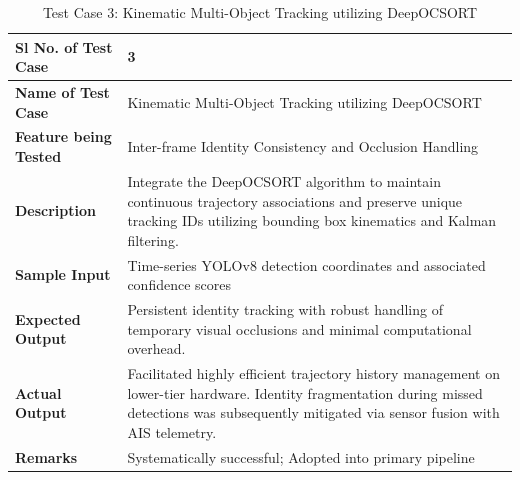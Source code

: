 \begin{table}[H]
\centering
\caption{Test Case 3: Kinematic Multi-Object Tracking utilizing DeepOCSORT}
\label{tab:testcase3}
\begin{tabular}{|p{}|p{}|}
\hline
\textbf{Sl No. of Test Case} & 3 \\
\hline
\textbf{Name of Test Case} & Kinematic Multi-Object Tracking utilizing DeepOCSORT \\
\hline
\textbf{Feature being Tested} & Inter-frame Identity Consistency and Occlusion Handling \\
\hline
\textbf{Description} & Integrate the DeepOCSORT algorithm to maintain continuous trajectory associations and preserve unique tracking IDs utilizing bounding box kinematics and Kalman filtering. \\
\hline
\textbf{Sample Input} & Time-series YOLOv8 detection coordinates and associated confidence scores \\
\hline
\textbf{Expected Output} & Persistent identity tracking with robust handling of temporary visual occlusions and minimal computational overhead. \\
\hline
\textbf{Actual Output} & Facilitated highly efficient trajectory history management on lower-tier hardware. Identity fragmentation during missed detections was subsequently mitigated via sensor fusion with AIS telemetry. \\
\hline
\textbf{Remarks} & Systematically successful; Adopted into primary pipeline \\
\hline
\end{tabular}
\end{table}

